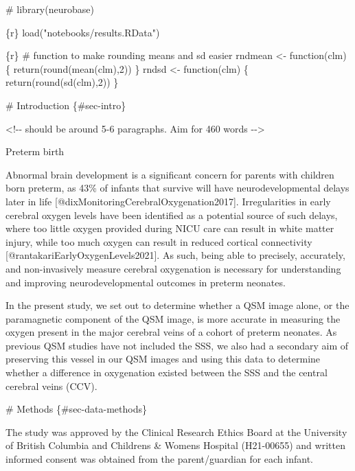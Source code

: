 \documentclass[
  letterpaper,
  DIV=11,
  numbers=noendperiod]{scrartcl}
\newenvironment{Shaded}{\begin{snugshade}}{\end{snugshade}}
\newcommand{\NormalTok}[1]{\textcolor[rgb]{0.00,0.23,0.31}{#1}}
\begin{document}
\begin{Shaded}
\begin{Highlighting}[]
\NormalTok{\# library(neurobase)}
\NormalTok{\textasciigrave{}\textasciigrave{}\textasciigrave{}}

\NormalTok{\textasciigrave{}\textasciigrave{}\textasciigrave{}\{r\}}
\NormalTok{load("notebooks/results.RData")}
\NormalTok{\textasciigrave{}\textasciigrave{}\textasciigrave{}}

\NormalTok{\textasciigrave{}\textasciigrave{}\textasciigrave{}\{r\}}
\NormalTok{\# function to make rounding means and sd easier}
\NormalTok{rndmean \textless{}{-} function(clm) \{}
\NormalTok{  return(round(mean(clm),2))}
\NormalTok{\}}
\NormalTok{rndsd \textless{}{-} function(clm) \{}
\NormalTok{  return(round(sd(clm),2))}
\NormalTok{\}}
\NormalTok{\textasciigrave{}\textasciigrave{}\textasciigrave{}}

\NormalTok{\# Introduction \{\#sec{-}intro\}}

\NormalTok{\textless{}!{-}{-} should be around 5{-}6 paragraphs. Aim for 460 words {-}{-}\textgreater{}}

\NormalTok{Preterm birth }

\NormalTok{Abnormal brain development is a significant concern for parents with children born preterm, as 43\% of infants that survive will have neurodevelopmental delays later in life [@dixMonitoringCerebralOxygenation2017]. Irregularities in early cerebral oxygen levels have been identified as a potential source of such delays, where too little oxygen provided during NICU care can result in white matter injury, while too much oxygen can result in reduced cortical connectivity [@rantakariEarlyOxygenLevels2021]. As such, being able to precisely, accurately, and non{-}invasively measure cerebral oxygenation is necessary for understanding and improving neurodevelopmental outcomes in preterm neonates. }

\NormalTok{In the present study, we set out to determine whether a QSM image alone, or the paramagnetic component of the QSM image, is more accurate in measuring the oxygen present in the major cerebral veins of a cohort of preterm neonates. As previous QSM studies have not included the SSS, we also had a secondary aim of preserving this vessel in our QSM images and using this data to determine whether a difference in oxygenation existed between the SSS and the central cerebral veins (CCV).}


\NormalTok{\# Methods \{\#sec{-}data{-}methods\}}

\NormalTok{The study was approved by the Clinical Research Ethics Board at the University of British Columbia and Children\textquotesingle{}s \& Women\textquotesingle{}s Hospital (H21{-}00655) and written informed consent was obtained from the parent/guardian for each infant.}


\end{Highlighting}
\end{Shaded}
\end{document}
